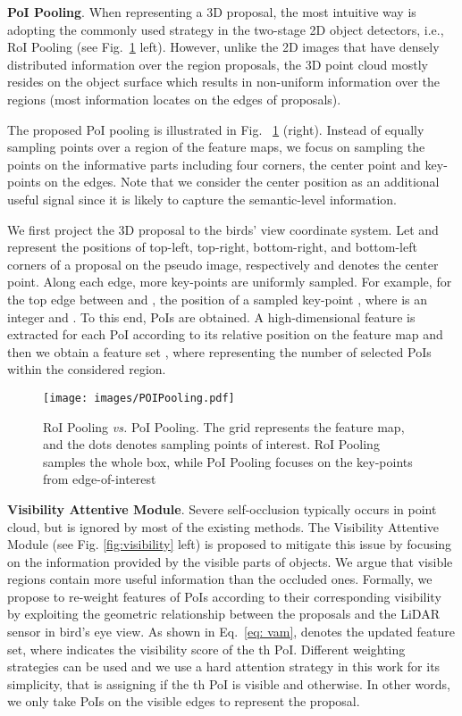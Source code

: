 \documentclass[runningheads]{llncs}
\begin{document}
\noindent\textbf{PoI Pooling}.
When representing a 3D proposal, the most intuitive way is adopting the commonly used strategy in the two-stage 2D object detectors, i.e., RoI Pooling (see Fig.~\ref{fig:POIPooling} left). However, unlike the 2D images that have densely distributed information over the region proposals, the 3D point cloud mostly resides on the object surface which results in non-uniform information over the regions (most information locates on the edges of proposals).

The proposed PoI pooling is illustrated in Fig. ~\ref{fig:POIPooling} (right). Instead of equally sampling points over a region of the feature maps, we focus on sampling the points on the informative parts including four corners, the center point and key-points on the edges. Note that we consider the center position as an additional useful signal since it is likely to capture the semantic-level information. 

We first project the 3D proposal to the birds' view coordinate system. Let  and  represent the positions of top-left, top-right, bottom-right, and bottom-left corners of a proposal on the pseudo image, respectively and  denotes the center point. Along each edge,  more key-points are uniformly sampled. For example, for the top edge between  and , the position of a sampled key-point , where  is an integer and . 
To this end,  PoIs are obtained. A high-dimensional feature is extracted for each PoI according to its relative position on the feature map and then we obtain a feature set , where  representing the number of selected PoIs within the considered region. 

\begin{figure}[t]
\centering
  \texttt{[image: images/POIPooling.pdf]}
\caption{RoI Pooling  \emph{vs.} PoI Pooling. The grid represents the feature map, and the dots denotes sampling points of interest. RoI Pooling samples the whole box, while PoI Pooling focuses on the key-points from edge-of-interest}
\label{fig:POIPooling}
\end{figure}

\noindent\textbf{Visibility Attentive Module}.
Severe self-occlusion typically occurs in point cloud, but is ignored by most of the existing methods. The Visibility Attentive Module (see Fig. \ref{fig:visibility} left) is proposed to mitigate this issue by focusing on the information provided by the visible parts of objects. We argue that visible regions contain more useful information than the occluded ones. Formally, we propose to re-weight features of PoIs according to their corresponding visibility by exploiting the geometric relationship between the proposals and the LiDAR sensor in bird’s eye view. As shown in Eq.~\ref{eq: vam},  denotes the updated feature set, where  indicates the visibility score of the th PoI. Different weighting strategies can be used and we use a hard attention strategy in this work for its simplicity, that is assigning  if the th PoI is visible and  otherwise. In other words, we only take PoIs on the visible edges to represent the proposal. 
\end{document}
